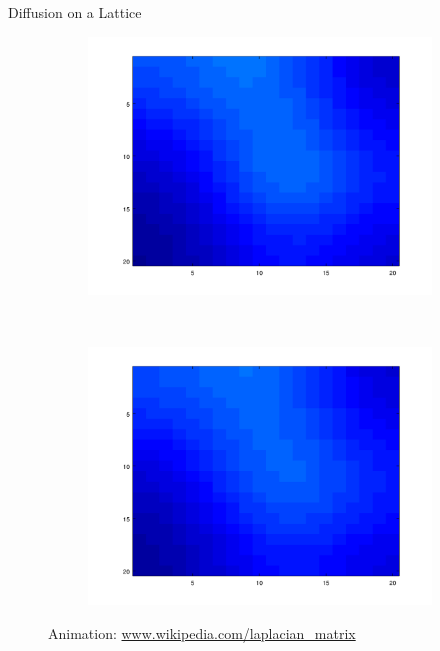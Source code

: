 \documentclass[10pt]{beamer}
\begin{document}
\begin{frame}{Diffusion on a Lattice}
\begin{figure}[!h]
\begin{subfigure}[b]{0.25\textwidth}
			\includegraphics[width= \textwidth]{images/anim_455.png}
		\end{subfigure}~
		\begin{subfigure}[b]{0.25\textwidth}
			\includegraphics[width= \textwidth]{images/anim_500.png}
		\end{subfigure}
		Animation: \url{www.wikipedia.com/laplacian_matrix}
	\end{figure}
\end{frame}
\end{document}

